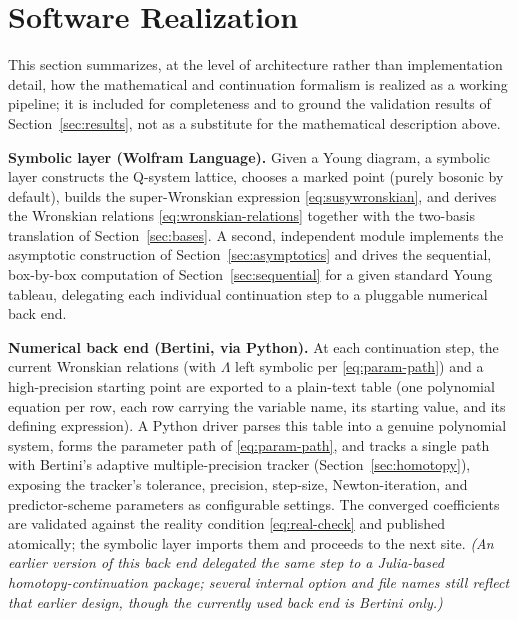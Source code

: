 \documentclass[11pt]{article}
\begin{document}
\section{Software Realization}
\label{sec:implementation}

This section summarizes, at the level of architecture rather than
implementation detail, how the mathematical and continuation formalism
is realized as a working pipeline; it is included for completeness and to
ground the validation results of Section~\ref{sec:results}, not as a
substitute for the mathematical description above.

\textbf{Symbolic layer (Wolfram Language).} Given a Young diagram, a
symbolic layer constructs the Q-system lattice, chooses a marked point (purely bosonic by default),
builds the super-Wronskian expression \eqref{eq:susywronskian}, and
derives the Wronskian relations \eqref{eq:wronskian-relations} together
with the two-basis translation of Section~\ref{sec:bases}. A second,
independent module implements the asymptotic construction of
Section~\ref{sec:asymptotics} and drives the sequential, box-by-box
computation of Section~\ref{sec:sequential} for a given standard Young
tableau, delegating each individual continuation step to a pluggable
numerical back end.

\textbf{Numerical back end (Bertini, via Python).} At each continuation
step, the current Wronskian relations (with $\Lambda$ left symbolic per
\eqref{eq:param-path}) and a high-precision starting point are exported to
a plain-text table (one polynomial equation per row, each row carrying
the variable name, its starting value, and its defining expression). A
Python driver parses this table into a genuine polynomial system, forms
the parameter path of \eqref{eq:param-path}, and tracks a single path with
Bertini's adaptive multiple-precision tracker (Section~\ref{sec:homotopy}),
exposing the tracker's tolerance, precision, step-size, Newton-iteration,
and predictor-scheme parameters as configurable settings. The converged
coefficients are validated against the reality condition
\eqref{eq:real-check} and published atomically; the symbolic layer imports
them and proceeds to the next site. \emph{(An earlier version of this
back end delegated the same step to a Julia-based homotopy-continuation
package; several internal option and file names still reflect that
earlier design, though the currently used back end is Bertini only.)}
\end{document}
